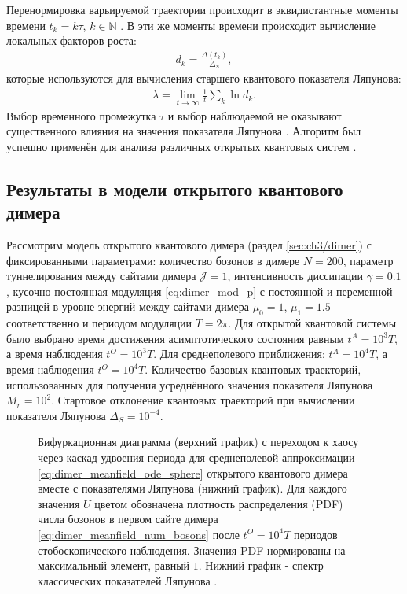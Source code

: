 Перенормировка варьируемой траектории происходит в эквидистантные моменты времени $t_k = k \tau$, $k \in \mathbb{N}$ \cite{Benettin1976}.
В эти же моменты времени происходит вычисление локальных факторов роста:
\begin{equation}
	\label{eq:le_growth_factor}
	\begin{gathered}
		d_k = \frac{\Delta(t_k)}{\Delta_S},
	\end{gathered}
\end{equation}
которые используются для вычисления старшего квантового показателя Ляпунова:
\begin{equation}
	\label{eq:le}
	\begin{gathered}
		\lambda=\lim\limits_{t \to \infty} \frac{1}{t} \sum\limits_k \ln d_k.
	\end{gathered}
\end{equation}
Выбор временного промежутка $\tau$ и выбор наблюдаемой не оказывают существенного влияния на значения показателя Ляпунова \cite{Yusipov2019_2}. Алгоритм был успешно применён для анализа различных открытых квантовых систем \cite{Yusipov2019_2, Yusipov2020, Yusipov2021}.

\subsection{Результаты в модели открытого квантового димера}
Рассмотрим модель открытого квантового димера (раздел \cref{sec:ch3/dimer}) с фиксированными параметрами: количество бозонов в димере $N=200$, параметр туннелирования между сайтами димера $\mathcal{J}=1$, интенсивность диссипации $\gamma=0.1$, кусочно-постоянная модуляция \cref{eq:dimer_mod_p} с постоянной и переменной разницей в уровне энергий между сайтами димера $\mu_0=1$, $\mu_1=1.5$ соответственно и периодом модуляции $T=2\pi$. Для открытой квантовой системы было выбрано время достижения асимптотического состояния равным \(t^A = 10^3T\), а время наблюдения \(t^O = 10^3T\). Для среднеполевого приближения: \(t^A = 10^4T\), а время наблюдения \(t^O = 10^4T\). Количество базовых квантовых траекторий, использованных для получения усреднённого значения показателя Ляпунова $M_r=10^2$. Стартовое отклонение квантовых траекторий при вычислении показателя Ляпунова $\Delta_S = 10^{-4}$.

\begin{figure}[ht]
	\centerfloat{
		\texttt{[image: le\_1]}
	}
	\caption[Бифуркационная диаграмма с переходом к хаосу через каскад удвоения периода для среднеполевой аппроксимации открытого квантового димера вместе с показателями Ляпунова]{
		Бифуркационная диаграмма (верхний график) с переходом к хаосу через каскад удвоения периода для среднеполевой аппроксимации \cref{eq:dimer_meanfield_ode_sphere} открытого квантового димера вместе с показателями Ляпунова (нижний график). Для каждого значения $U$ цветом обозначена плотность распределения (PDF) числа бозонов в первом сайте димера \cref{eq:dimer_meanfield_num_bosons} после \(t^O = 10^4T\) периодов стобоскопического наблюдения. Значения PDF нормированы на максимальный элемент, равный $1$. Нижний график - спектр классических показателей Ляпунова \cite{Benettin1976}.
	}
	\label{fig:le_1}
\end{figure}


